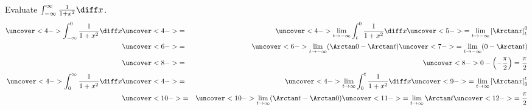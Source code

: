\begin{frame}
\begin{example} %
Evaluate $\int_{-\infty}^\infty \frac{1}{1+x^2}\diff x$.
\abovedisplayskip=0pt
\belowdisplayskip=0pt
%
\begin{eqnarray*}
\uncover<4->{%
\int_{-\infty}^0 \frac{1}{1+x^2}\diff x%
}%
& \uncover<4->{ = } &%
\uncover<4->{%
\lim_{t\rightarrow -\infty} \int_{t}^0 \frac{1}{1+x^2}\diff x%
}%
\uncover<5->{%
 = \lim_{t\rightarrow -\infty} \left[ \Arctan x\right]_t^0%
}\\%
& \uncover<6->{ = } &%
\uncover<6->{%
\lim_{t\rightarrow -\infty} (\Arctan 0 - \Arctan t)%
}%
\uncover<7->{%
 = \lim_{t\rightarrow -\infty}  (0 -\Arctan t) %
}\\%
& \uncover<8->{ = } &%
\uncover<8->{%
0 - \left( -\frac{\pi}{2}\right) = \frac{\pi}{2}%
}\\%
\uncover<4->{%
\int_0^{\infty} \frac{1}{1+x^2}\diff x%
}%
& \uncover<4->{ = } &%
\uncover<4->{%
\lim_{t\rightarrow \infty} \int_{0}^t \frac{1}{1+x^2}\diff x%
}%
\uncover<9->{%
 = \lim_{t\rightarrow \infty} \left[ \Arctan x\right]_0^t%
}\\%
& \uncover<10->{ = } &%
\uncover<10->{%
\lim_{t\rightarrow \infty} (\Arctan t - \Arctan 0)%
}%
\uncover<11->{%
 = \lim_{t\rightarrow \infty} \Arctan t %
}%
\uncover<12->{%
 = \frac{\pi}{2}
}%
\end{eqnarray*}
\end{example}
\end{frame}
